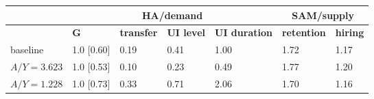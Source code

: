 \begin{tabular}{lllllll}
\multicolumn{1}{c}{}& \multicolumn{4}{c}{\textbf{HA/demand}} & \multicolumn{2}{c}{\textbf{SAM/supply}}\\
\toprule
 & \textbf{G} & \textbf{transfer}  & \textbf{UI level} & \textbf{UI duration} & \textbf{retention} & \textbf{hiring}\\
\midrule
baseline & 1.0 [0.60] & 0.19  & 0.41 & 1.00 & \color{gray}1.72 & \color{gray}1.17\\
$A/Y = 3.623$ & 1.0 [0.53] & 0.10  & 0.23 & 0.49 & \color{gray}1.77 & \color{gray}1.20\\
$A/Y = 1.228$ & 1.0 [0.73] & 0.33  & 0.71 & 2.06 & \color{gray}1.70 & \color{gray}1.16\\
\bottomrule
\end{tabular}
